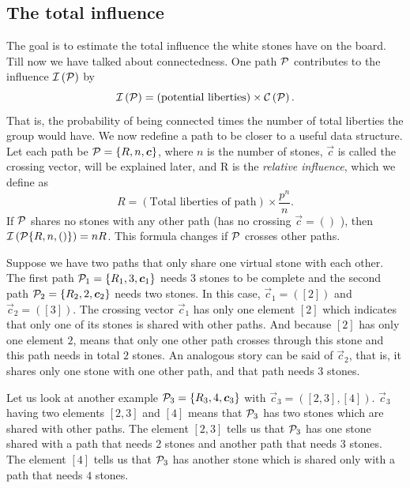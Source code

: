 \documentclass[doublespacing, 12pt, a4paper]{article}
\begin{document}
\subsection*{The total influence}

The goal is to estimate the total influence the white stones have on the board. Till now we have talked about connectedness. One path $\mathcal P$ contributes to the influence $\mathcal I \left(\mathcal P\right)$ by
\[
\mathcal I \left(\mathcal P\right) = (\text{potential liberties}) \times \mathcal C \left(\mathcal P\right).
\]
That is, the probability of being connected times the number of total liberties the group would have.
We now redefine a path to be closer to a useful data structure. Let each path be $\mathcal P = \{R,n,\boldsymbol{c}\}$, where $n$ is the number of stones, $\vec c$ is called the crossing vector, will be explained later, and
R is the \emph{relative influence}, which we define as
\[
R = (\text{Total liberties of path}) \times \frac{p^n}{n}.
\]
If $\mathcal P$ shares no stones with any other path (has no crossing $\vec c = ()$ ), then $\mathcal I \left(\mathcal P\{R,n,()\} \right) = n R$. This formula changes if $\mathcal P$ crosses other paths.

Suppose we have two paths that only share one virtual stone with each other. The first path $\mathcal P_1 = \{R_1 ,3,\boldsymbol{c}_1\}$ needs 3 stones to be complete and the second path $\mathcal P_2 =\{R_2, 2, \boldsymbol{c}_2 \}$ needs two stones. In this case, $\vec c_1 = ([2])$ and $\vec c_2 = ([3])$. The crossing vector $\vec c_1$ has only one element $[2]$ which indicates that only one of its stones is shared with other paths. And because $[2]$ has only one element $2$, means that only one other path crosses through this stone and this path needs in total $2$ stones.
An analogous story can be said of $\vec c_2$, that is, it shares only one stone with one other path, and that path needs 3 stones.

Let us look at another example $\mathcal P_3 = \{R_3, 4,\boldsymbol{c}_3\}$ with $\vec c_3 =([2,3],[4])$. $\vec c_3$ having two elements $[2,3]$ and $[4]$ means that $\mathcal P_3$ has two stones which are shared with other paths. The element $[2,3]$ tells us that $\mathcal P_3$ has one stone shared with a path that needs 2 stones and another path that needs 3 stones. The element $[4]$ tells us that $\mathcal P_3$ has another stone which is shared only with a path that needs $4$ stones.
\end{document}
